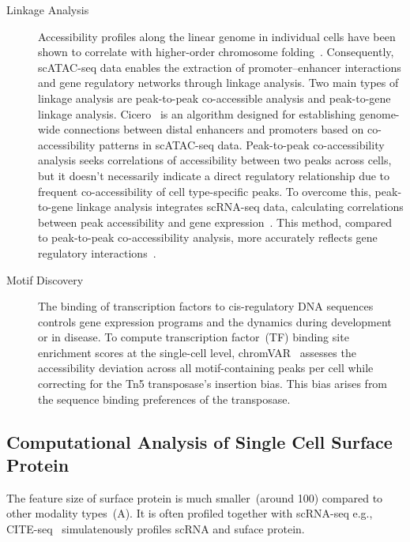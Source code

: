 \begin{description}
	\item[Linkage Analysis]
	Accessibility profiles along the linear genome in individual cells have been shown to correlate with higher-order chromosome folding~\citep{Buenrostro2015}. Consequently, scATAC-seq data enables the extraction of promoter–enhancer interactions and gene regulatory networks through linkage analysis. Two main types of linkage analysis are peak-to-peak co-accessible analysis and peak-to-gene linkage analysis. Cicero~\citep{pliner2018cicero} is an algorithm designed for establishing genome-wide connections between distal enhancers and promoters based on co-accessibility patterns in scATAC-seq data. Peak-to-peak co-accessibility analysis seeks correlations of accessibility between two peaks across cells, but it doesn't necessarily indicate a direct regulatory relationship due to frequent co-accessibility of cell type-specific peaks. To overcome this, peak-to-gene linkage analysis integrates scRNA-seq data, calculating correlations between peak accessibility and gene expression~\citep{Granja2021}. This method, compared to peak-to-peak co-accessibility analysis, more accurately reflects gene regulatory interactions~\citep{shi2022scatacoverview}.

	\item[Motif Discovery]
	The binding of transcription factors to cis-regulatory DNA sequences controls gene expression programs and the dynamics during development or in disease. To compute transcription factor~(TF) binding site enrichment scores at the single-cell level, chromVAR~\citep{schep2017chromvar} assesses the accessibility deviation across all motif-containing peaks per cell while correcting for the Tn5 transposase's insertion bias. This bias arises from the sequence binding preferences of the transposase.

\end{description}

\subsection{Computational Analysis of Single Cell Surface Protein}
\label{background:sec2:protein}
The feature size of surface protein is much smaller~(around 100) compared to other modality types~(A). It is often profiled together with scRNA-seq e.g., CITE-seq~\citep{citeseq2017} simulatenously profiles scRNA and suface protein.

